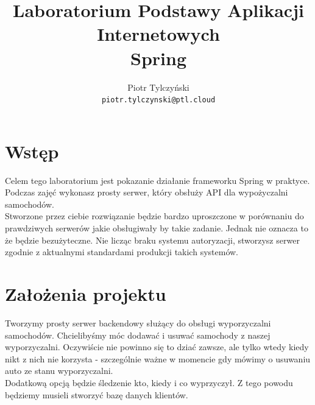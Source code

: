 \documentclass{article}
\begin{document}
    \title{Laboratorium Podstawy Aplikacji Internetowych \\
    Spring}
    \author{Piotr Tylczyński \\
    \texttt{piotr.tylczynski@ptl.cloud}}
    
    \begin{titlepage}
        \maketitle
    \end{titlepage}
    
    \tableofcontents
    \pagebreak
    
    \section{Wstęp}
    Celem tego laboratorium jest pokazanie działanie frameworku Spring w praktyce. Podczas zajęć wykonasz prosty serwer, który obsłuży API dla wypożyczalni samochodów. \\
    Stworzone przez ciebie rozwiązanie będzie bardzo uproszczone w porównaniu do prawdziwych serwerów jakie obsługiwały by takie zadanie. Jednak nie oznacza to że będzie bezużyteczne. Nie licząc braku systemu autoryzacji, stworzysz serwer zgodnie z aktualnymi standardami produkcji takich systemów.
    
    \section{Założenia projektu}
        Tworzymy prosty serwer backendowy służący do obsługi wyporzyczalni samochodów. Chcielibyśmy móc dodawać i usuwać samochody z naszej wyporzyczalni. Oczywiście nie powinno się to dziać zawsze, ale tylko wtedy kiedy nikt z nich nie korzysta - szczególnie ważne w momencie gdy mówimy o usuwaniu auto ze stanu wyporzyczalni. \\
        Dodatkową opcją będzie śledzenie kto, kiedy i co wyprzyczył. Z tego powodu będziemy musieli stworzyć bazę danych klientów.
    
\end{document}
